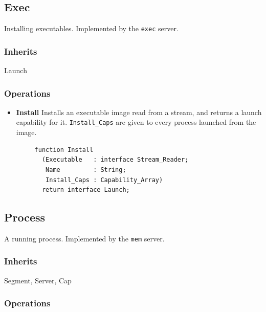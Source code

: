 \subsection{Exec}

Installing executables.  Implemented by the {\tt exec} server.

\subsubsection{Inherits}

Launch

\subsubsection{Operations}

\begin{itemize}
    \item \textbf{Install} Installs an executable image read from a stream, and returns a launch capability for it.  {\tt Install\_Caps} are given to every process launched from the image.

    \begin{verbatim}
     function Install
       (Executable   : interface Stream_Reader;
        Name         : String;
        Install_Caps : Capability_Array)
       return interface Launch;
    \end{verbatim}
\end{itemize}

\subsection{Process}

A running process.  Implemented by the {\tt mem} server.

\subsubsection{Inherits}

Segment, Server, Cap

\subsubsection{Operations}

